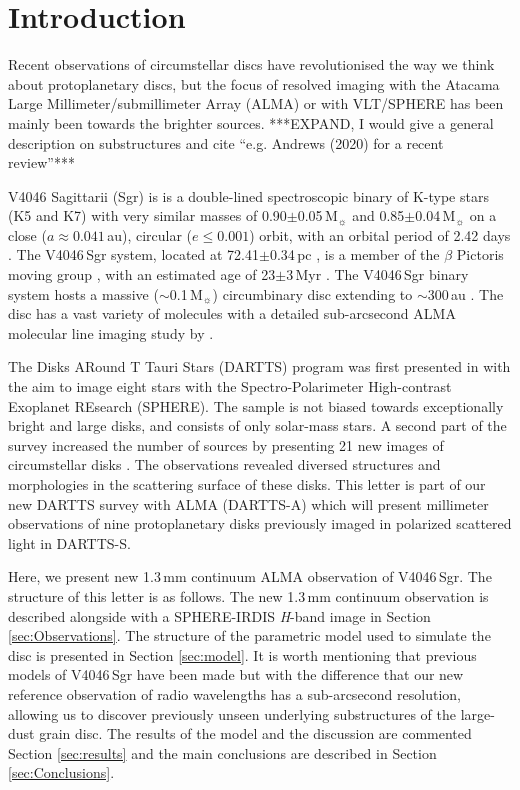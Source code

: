 \documentclass[letters,usenatbib,times]{mnras}
\begin{document}
\section{Introduction} \label{sec:Introduction}

Recent observations of circumstellar discs have revolutionised the way we think about protoplanetary discs, but the focus of resolved imaging with the Atacama Large Millimeter/submillimeter Array (ALMA) or with VLT/SPHERE has been mainly been towards the brighter sources. ***EXPAND, I would give a general description on substructures and cite ``e.g. Andrews (2020) for a recent review''***

V4046 Sagittarii (Sgr) is is a double-lined spectroscopic binary of K-type stars (K5 and K7) with very similar masses of 0.90$\pm$0.05\,M$_{\sun}$ and 0.85$\pm$0.04\,M$_{\sun}$ \citep{Rosenfeld_2012} on a close ($a \approx 0.041$\,au), circular ($e\leq0.001$) orbit, with an orbital period of 2.42 days \citep{refId0}. The V4046\,Sgr system, located at 72.41$\pm$0.34\,pc \citep{Gaia}, is a member of the $\beta$ Pictoris moving group \citep{Zuckerman_2004}, with an estimated age of 23$\pm$3\,Myr \citep{Mamajek_2014}. The V4046\,Sgr binary system hosts a massive ($\sim$0.1\,M$_{\sun}$) circumbinary disc extending to $\sim$300\,au \citep{Rosenfeld_2013, Rodriguez_2010}. The disc has a vast variety of molecules with a detailed sub-arcsecond ALMA molecular line imaging study by \citet{Kastner_2018}. 

The Disks ARound T Tauri Stars (DARTTS) program was first presented in \citet{Avenhaus_2018} with the aim to image eight stars with the Spectro-Polarimeter High-contrast Exoplanet REsearch (SPHERE). The sample is not biased towards exceptionally bright and large disks, and consists of only solar-mass stars. A second part of the survey increased the number of sources by presenting 21 new images of circumstellar disks \citep{Garufi2020}.  The observations revealed diversed structures and morphologies in the scattering surface of these disks.  This letter is part of our new DARTTS survey with ALMA (DARTTS-A) which will present millimeter observations of nine protoplanetary disks previously imaged in polarized scattered light in DARTTS-S.  

Here, we present new 1.3\,mm continuum ALMA observation of V4046\,Sgr. The structure of this letter is as follows. The new 1.3\,mm continuum observation is described alongside with a SPHERE-IRDIS \textit{H}-band image in Section \ref{sec:Observations}. The structure of the parametric model used to simulate the disc is presented in Section \ref{sec:model}. It is worth mentioning that previous models of V4046\,Sgr have been made \citep{Ru_z_Rodr_guez_2019, Rosenfeld_2013, 2019ApJ...882..160Q} but with the difference that our new reference observation of radio wavelengths has a sub-arcsecond resolution, allowing us to discover previously unseen underlying substructures of the large-dust grain disc.  The results of the model and the discussion are commented Section \ref{sec:results} and the main conclusions are described in Section \ref{sec:Conclusions}.
\end{document}
